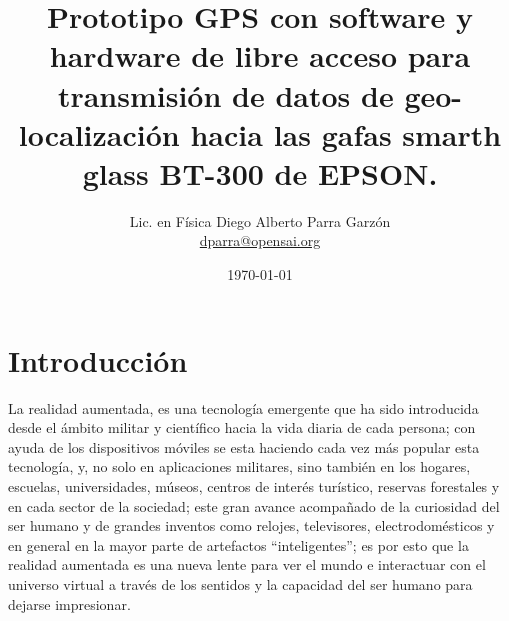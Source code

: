\documentclass[jou]{apa6} %
\title{Prototipo GPS con software y hardware de libre acceso para transmisión de datos de geo-localización hacia las gafas smarth glass BT-300 de EPSON.}
\author{Lic. en Física Diego Alberto Parra Garzón \\ \href{mailto:{dparra@opensai.org}}{dparra@opensai.org}}
\date{\today}
\affiliation{OPENSAI, SENA}
\begin{document}
\renewcommand{\tablename}{Tabla} %
\renewcommand{\refname}{Referencias} %
\def\st@rtbibsection{\mspart{Referencias}}%
\renewcommand{\rheadname}{Encabezado de página}%
\renewcommand{\acksname}{Nota de Autor}%
\renewcommand{\keywordname}{Palabras clave}%
\renewcommand{\listtablename}{Índice de tablas}%
\renewcommand{\BOthers}[1]{et al.\hbox{}}
\renewcommand{\appendixname}{Ap} %
\renewcommand{\appendixname}{Anexo}
\renewcommand{\appendixname}{Anexos}
\renewcommand{\appendixtocname}{Anexos}
\renewcommand{\appendixpagename}{Anexos}
\maketitle



\tableofcontents
\listoffigures

\section{Introducción}
La realidad aumentada, es una tecnología emergente que ha sido introducida desde el ámbito militar  y científico hacia la vida diaria de cada persona; con ayuda de los dispositivos móviles se esta haciendo cada vez más popular esta tecnología, y, no solo en aplicaciones militares,  \cite{fombona2012realidad} sino también en los hogares, escuelas, universidades, múseos, centros de interés turístico, reservas forestales y  en cada sector de la sociedad; este gran avance acompañado de la curiosidad del ser humano y de grandes inventos como relojes, televisores, electrodomésticos y en general en la mayor parte de artefactos “inteligentes”; \cite{telefonica2011realidad} es por esto que la realidad aumentada es una nueva lente para ver el mundo e interactuar con el universo virtual a través de los sentidos y la  capacidad del ser humano para dejarse impresionar. 
\end{document}
